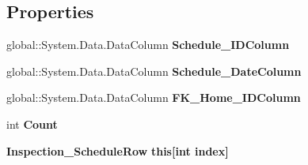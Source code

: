 \subsection*{Properties}
\begin{DoxyCompactItemize}
\item 
\mbox{\label{class_a_f_h___scheduler_1_1_home_inspection_db_data_set_1_1_inspection___schedule_data_table_a6734c0680535efc9b0e3173fe494c24d}} 
global\+::\+System.\+Data.\+Data\+Column {\bfseries Schedule\+\_\+\+I\+D\+Column}\hspace{0.3cm}{\ttfamily  [get]}
\item 
\mbox{\label{class_a_f_h___scheduler_1_1_home_inspection_db_data_set_1_1_inspection___schedule_data_table_aec475f2401b21140a19e97b85a23af22}} 
global\+::\+System.\+Data.\+Data\+Column {\bfseries Schedule\+\_\+\+Date\+Column}\hspace{0.3cm}{\ttfamily  [get]}
\item 
\mbox{\label{class_a_f_h___scheduler_1_1_home_inspection_db_data_set_1_1_inspection___schedule_data_table_a4afc795bfaf32600ce3ea7445cc292c3}} 
global\+::\+System.\+Data.\+Data\+Column {\bfseries F\+K\+\_\+\+Home\+\_\+\+I\+D\+Column}\hspace{0.3cm}{\ttfamily  [get]}
\item 
\mbox{\label{class_a_f_h___scheduler_1_1_home_inspection_db_data_set_1_1_inspection___schedule_data_table_a2e28e552078c479c19cd97b048c2d7fd}} 
int {\bfseries Count}\hspace{0.3cm}{\ttfamily  [get]}
\item 
\mbox{\label{class_a_f_h___scheduler_1_1_home_inspection_db_data_set_1_1_inspection___schedule_data_table_a2a0c5f4887971b6f056adaec3c1587b9}} 
\textbf{ Inspection\+\_\+\+Schedule\+Row} {\bfseries this[int index]}\hspace{0.3cm}{\ttfamily  [get]}
\end{DoxyCompactItemize}
